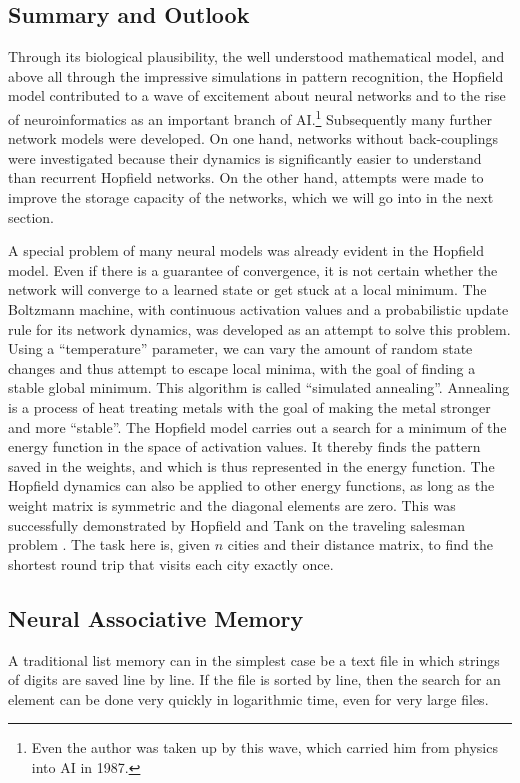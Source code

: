 \documentclass[10pt]{book}
\begin{document}
\subsection{Summary and Outlook}
Through its biological plausibility, the well understood mathematical model, and above all through the impressive simulations in pattern recognition, the Hopfield model contributed to a wave of excitement about neural networks and to the rise of neuroinformatics as an important branch of AI.\footnote{Even the author was taken up by this wave, which carried him from physics into AI in 1987.} Subsequently many further network models were developed. On one hand, networks without back-couplings were investigated because their dynamics is significantly easier to understand than recurrent Hopfield networks. On the other hand, attempts were made to improve the storage capacity of the networks, which we will go into in the next section.

A special problem of many neural models was already evident in the Hopfield model. Even if there is a guarantee of convergence, it is not certain whether the network will converge to a learned state or get stuck at a local minimum. The Boltzmann machine, with continuous activation values and a probabilistic update rule for its network dynamics, was developed as an attempt to solve this problem. Using a ``temperature'' parameter, we can vary the amount of random state changes and thus attempt to escape local minima, with the goal of finding a stable global minimum. This algorithm is called ``simulated annealing''. Annealing is a process of heat treating metals with the goal of making the metal stronger and more ``stable''.
The Hopfield model carries out a search for a minimum of the energy function in the space of activation values. It thereby finds the pattern saved in the weights, and which is thus represented in the energy function. The Hopfield dynamics can also be applied to other energy functions, as long as the weight matrix is symmetric and the diagonal elements are zero. This was successfully demonstrated by Hopfield and Tank on the traveling salesman problem \cite{hopfield1985optimization,zell1994simulation}. The task here is, given $n$ cities and their distance matrix, to find the shortest round trip that visits each city exactly once.

\subsection{Neural Associative Memory}
A traditional list memory can in the simplest case be a text file in which strings of digits are saved line by line. If the file is sorted by line, then the search for an element can be done very quickly in logarithmic time, even for very large files.
\end{document}
